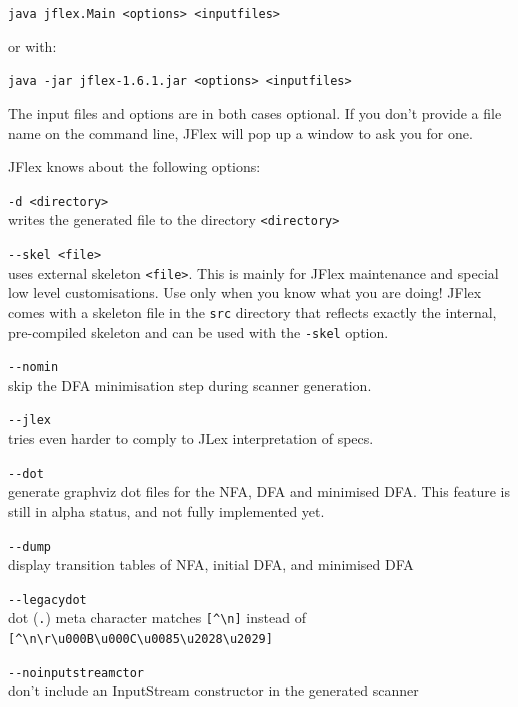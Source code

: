 \texttt{java\ jflex.Main\ \textless{}options\textgreater{}\ \textless{}inputfiles\textgreater{}}

or with:

\texttt{java\ -jar\ jflex-1.6.1.jar\ \textless{}options\textgreater{}\ \textless{}inputfiles\textgreater{}}

The input files and options are in both cases optional. If you don't
provide a file name on the command line, JFlex will pop up a window to
ask you for one.

JFlex knows about the following options:

\texttt{-d\ \textless{}directory\textgreater{}}\\writes the generated
file to the directory \texttt{\textless{}directory\textgreater{}}

\texttt{-\/-skel\ \textless{}file\textgreater{}}\\uses external skeleton
\texttt{\textless{}file\textgreater{}}. This is mainly for JFlex
maintenance and special low level customisations. Use only when you know
what you are doing! JFlex comes with a skeleton file in the \texttt{src}
directory that reflects exactly the internal, pre-compiled skeleton and
can be used with the \texttt{-skel} option.

\texttt{-\/-nomin}\\skip the DFA minimisation step during scanner
generation.

\texttt{-\/-jlex}\\tries even harder to comply to JLex interpretation of
specs.

\texttt{-\/-dot}\\generate graphviz dot files for the NFA, DFA and
minimised DFA. This feature is still in alpha status, and not fully
implemented yet.

\texttt{-\/-dump}\\display transition tables of NFA, initial DFA, and
minimised DFA

\texttt{-\/-legacydot}\\dot (\texttt{.}) meta character matches
\texttt{{[}\^{}\textbackslash{}n{]}} instead
of\\\texttt{{[}\^{}\textbackslash{}n\textbackslash{}r\textbackslash{}u000B\textbackslash{}u000C\textbackslash{}u0085\textbackslash{}u2028\textbackslash{}u2029{]}}

\texttt{-\/-noinputstreamctor}\\don't include an InputStream constructor
in the generated scanner

